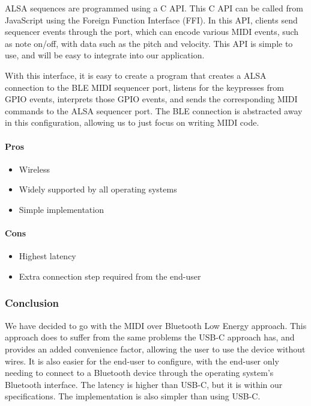 ALSA sequences are programmed using a C API. This C API can be called from JavaScript
using the Foreign Function Interface (FFI). In this API, clients send sequencer events
through the port, which can encode various MIDI events, such as note on/off, with data
such as the pitch and velocity. This API is simple to use, and will be easy to integrate
into our application.

With this interface, it is easy to create a program that creates a ALSA connection to the
BLE MIDI sequencer port, listens for the keypresses from GPIO events, interprets those
GPIO events, and sends the corresponding MIDI commands to the ALSA sequencer port. The BLE
connection is abstracted away in this configuration, allowing us to just focus on writing
MIDI code.

\paragraph{Pros}

\begin{itemize}
  \item Wireless
  \item Widely supported by all operating systems
  \item Simple implementation
\end{itemize}

\paragraph{Cons}

\begin{itemize}
  \item Highest latency
  \item Extra connection step required from the end-user
\end{itemize}

\subsubsection{Conclusion}

We have decided to go with the MIDI over Bluetooth Low Energy approach. This approach does
to suffer from the same problems the USB-C approach has, and provides an added convenience
factor, allowing the user to use the device without wires. It is also easier for the
end-user to configure, with the end-user only needing to connect to a Bluetooth device
through the operating system's Bluetooth interface. The latency is higher than USB-C, but
it is within our specifications. The implementation is also simpler than using USB-C.

